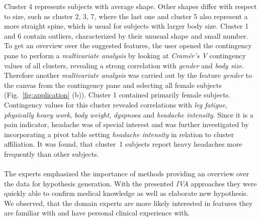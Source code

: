 \documentclass[journal]{style/vgtc} 			          %
\newcommand{\add}[1]{\textcolor{blue}{\uline{#1}}}
\newcommand{\com}[1]{\textcolor{orange}{\uline{#1}}}
\begin{document}
Cluster 4 represents subjects with average shape.
%
Other shapes differ with respect to size, such as cluster 2, 3, 7, where the last one and cluster 5 also represent a more straight spine, which is usual for subjects with larger body size.
%
Cluster 1 and 6 contain outliers, characterized by their unusual shape and small number.
%
%
To get an overview over the suggested features, the user opened the contingency pane to perform a \emph{multivariate analysis} by looking at \emph{Cram\'{e}r's V} contingency values of all clusters, revealing a strong correlation with \emph{gender} and \emph{body size}.
%
Therefore another \emph{multivariate analysis} was carried out by the feature \emph{gender} to the canvas from the contingency pane and selecting all female subjects (Fig.~\ref{fig:application} (b)).
%
Cluster 1 contained primarily female subjects.
%
Contingency values for this cluster revealed correlations with \emph{leg fatigue}, \emph{physically heavy work}, \emph{body weight}, \emph{dyspnoea} and \emph{headache intensity}.
%
%
Since it is a pain indicator, headache was of special interest and was further investigated by incorporating a pivot table setting \emph{headache intensity} in relation to cluster affiliation.
%
It was found, that cluster~1 subjects report heavy headaches more frequently than other subjects.
%
%
%
%
\\\\
The experts emphasized the importance of methods providing an overview over the data for hypothesis generation.
%
With the presented \emph{IVA} approaches they were quickly able to confirm medical knowledge as well as elaborate new hypothesis.
%
We observed, that the domain experts are more likely interested in features they are familiar with and have personal clinical experience with.
\end{document}
